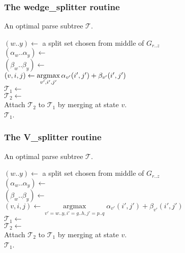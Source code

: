 \documentclass[11pt]{article}
\def\argmax{\mathop{\mathrm{argmax}}\limits}
\begin{document}
\subsubsection{The wedge\_splitter routine}
\begin{algorithm}
         {An optimal parse subtree $\mathcal{T}$.}

\begin{algtab*}
  $(w..y) \leftarrow$ a split set chosen from middle of $G_{r..z}$\\
  $(\alpha_w..\alpha_y) \leftarrow$ \\
  $(\beta_w..\beta_y)   \leftarrow$ \\
  $(v,i,j) \leftarrow \argmax\limits_{v',i',j'} 
	\alpha_{v'}(i',j') + \beta_{v'}(i',j')$\\
  $\mathcal{T}_1 \leftarrow$ \\
  $\mathcal{T}_2 \leftarrow$ \\
  Attach $\mathcal{T}_2$ to $\mathcal{T}_1$ by merging at state $v$.\\
  
  \algreturn $\mathcal{T}_1$.\\
\algend
\end{algtab*}
\end{algorithm}

\subsubsection{The V\_splitter routine}
\begin{algorithm}
         {An optimal parse subtree $\mathcal{T}$.}

\begin{algtab*}
  $(w..y) \leftarrow$ a split set chosen from middle of $G_{r..z}$\\
  $(\alpha_w..\alpha_y) \leftarrow$ \\
  $(\beta_w..\beta_y)   \leftarrow$ \\
  $(v,i,j) \leftarrow \argmax_{v'=w..y, i'=g..h, j'=p..q} 
	\alpha_{v'}(i',j') + \beta_{v'}(i',j')$\\
  $\mathcal{T}_1 \leftarrow$ \\
  $\mathcal{T}_2 \leftarrow$ \\
  Attach $\mathcal{T}_2$ to $\mathcal{T}_1$ by merging at state $v$.\\
  \algreturn $\mathcal{T}_1$.\\
\algend
\end{algtab*}
\end{algorithm}
\end{document}
